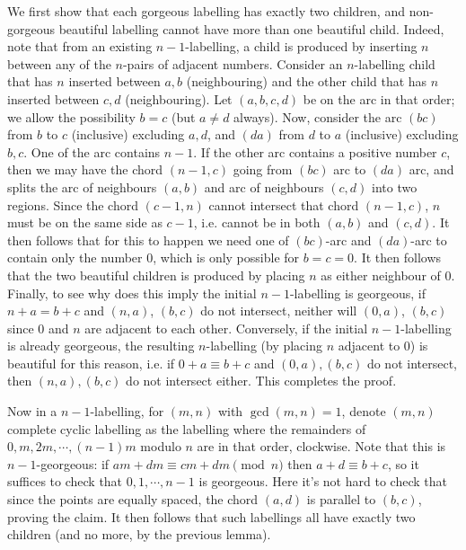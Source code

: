 \documentclass[11pt,a4paper]{article}
\begin{document}
\begin{enumerate}
	We first show that each gorgeous labelling has exactly two children, 
	and non-gorgeous beautiful labelling cannot have more than one beautiful child. 
	Indeed, note that from an existing $n-1$-labelling, a child is produced by inserting $n$ between any of the $n$-pairs of adjacent numbers. 
	Consider an $n$-labelling child that has $n$ inserted between $a, b$ (neighbouring) and the other child that has $n$ inserted between $c, d$ (neighbouring). 
	Let $(a, b, c, d)$ be on the arc in that order; we allow the possibility $b = c$ (but $a\neq d$ always). 
	Now, consider the arc $(bc)$ from $b$ to $c$ (inclusive) excluding $a, d$, and $(da)$ from $d$ to $a$ (inclusive) excluding $b, c$. 
	One of the arc contains $n - 1$. 
	If the other arc contains a positive number $c$, then we may have the chord $(n - 1, c)$ going from $(bc)$ arc to $(da)$ arc, and splits the arc of neighbours $(a, b)$ and arc of neighbours $(c, d)$ into two regions. 
	Since the chord $(c - 1, n)$ cannot intersect that chord $(n - 1, c)$, 
	$n$ must be on the same side as $c - 1$, i.e. cannot be in both $(a, b)$ and $(c, d)$. 
	It then follows that for this to happen we need one of $(bc)$-arc and $(da)$-arc to contain only the number 0, 
	which is only possible for $b = c = 0$. 
	It then follows that the two beautiful children is produced by placing $n$ as either neighbour of 0. 
	Finally, to see why does this imply the initial $n - 1$-labelling is georgeous, 
	if $n + a = b + c$ and $(n, a)$, $(b, c)$ do not intersect, neither will $(0, a)$, $(b, c)$ since 0 and $n$ are adjacent to each other. 
	Conversely, if the initial $n - 1$-labelling is already georgeous, the resulting $n$-labelling (by placing $n$ adjacent to 0) is beautiful for this reason, 
	i.e. if $0 + a \equiv b + c$ and $(0, a), (b, c)$ do not intersect, 
	then $(n, a), (b, c)$ do not intersect either. 
	This completes the proof. 
	
	Now in a $n - 1$-labelling, for $(m, n)$ with $\gcd(m, n) = 1$, 
	denote $(m, n)$ complete cyclic labelling as the labelling where the remainders of $0, m, 2m, \cdots, (n - 1)m$ modulo $n$ are in that order, clockwise. 
	Note that this is $n - 1$-georgeous: if $am + dm\equiv cm + dm\pmod{n}$ then $a + d\equiv b + c$, 
	so it suffices to check that $0, 1, \cdots, n - 1$ is georgeous. 
	Here it's not hard to check that since the points are equally spaced, the chord $(a, d)$ is parallel to $(b, c)$, proving the claim. 
	It then follows that such labellings all have exactly two children (and no more, by the previous lemma). 
	

\end{enumerate}
\end{document}
